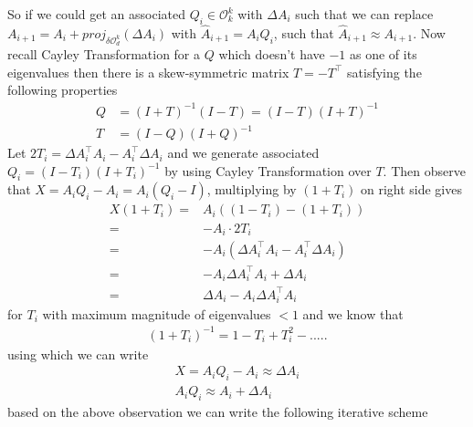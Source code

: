 So if we could get an associated $Q_i \in \mathcal{O}_k^k$ with $\Delta A_i$ such that we can replace $A_{i+1} = A_i+proj_{\delta \mathcal{O}_d^k}(\Delta A_i)$ with $\hat{A}_{i+1} = A_iQ_i$, such that $\hat{A}_{i+1} \approx A_{i+1}$.
\newline \newline Now recall Cayley Transformation for a $Q$ which doesn't have $-1$ as one of its eigenvalues then there is a skew-symmetric matrix $T = -T^\top$ satisfying the following properties
\begin{equation} \label{cayley-transformation} 
\begin{aligned}
    Q &= (I+T)^{-1}(I-T) = (I-T)(I+T)^{-1} \\
    T &= (I-Q)(I+Q)^{-1}
\end{aligned}
\end{equation}
Let $2T_i = \Delta A_i^\top A_i- A_i^\top \Delta A_i$ and we generate associated $Q_i = (I-T_i)(I+T_i)^{-1}$ by using Cayley Transformation over $T$.
\newline Then observe that $X = A_iQ_i-A_i = A_i(Q_i-I)$, multiplying by $(1+T_i)$ on right side gives 
\begin{equation}
\begin{aligned}
    X(1+T_i) =& A_i((1-T_i)-(1+T_i)) \\
    =& -A_i\cdot 2T_i \\
    =& -A_i(\Delta A_i^\top A_i- A_i^\top \Delta A_i) \\
    =&  -A_i\Delta A_i^\top A_i+ \Delta A_i \\
    =& \Delta A_i - A_i\Delta A_i^\top A_i
\end{aligned}
\end{equation}
for $T_i$ with maximum magnitude of eigenvalues $ < 1$ and we know that  
\begin{equation}
\begin{aligned}
    (1+T_i)^{-1} = 1 - T_i +T^2_i - .....
\end{aligned}
\end{equation}
using which we can write
\begin{equation}
\begin{aligned}
     X = A_iQ_i-A_i \approx \Delta A_i\\
     A_iQ_i \approx A_i + \Delta A_i
\end{aligned}
\end{equation}
\newline based on the above observation we can write the following iterative scheme

